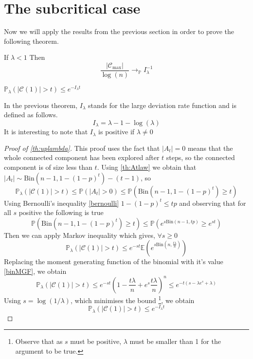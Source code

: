 \section{The subcritical case}
Now we will apply the results from the previous section in order to prove the following theorem.
\begin{theorem}\label{th:subCritCV}
	If $\lambda < 1$
	\newline
	Then
	\begin{equation}
		\frac{|\mathcal{C}_{\max}|}{\log(n)} \longrightarrow_\mathbb{P} I_{\lambda}^{-1}
	\end{equation}
\end{theorem}
\begin{theorem}\label{th:uplambda}
	$\mathbb{P}_{\lambda}(|\mathcal{C}(1)| >t) \leq e^{-I_{\lambda}t}$
\end{theorem}
In the previous theorem, $I_{\lambda}$ stands for the large deviation rate function and is defined as follows.
\begin{equation}
	I_{\lambda} = \lambda - 1 - \log(\lambda)
\end{equation}
It is interesting to note that $I_\lambda$ is positive if $\lambda \neq 0$
\begin{proof}[Proof of \ref{th:uplambda}]
	This proof uses the fact that $|A_t| = 0$ means that the whole connected component has been explored after $t$ steps, so the connected component is of size less than $t$.
	Using \ref{th:Atlaw} we obtain that $|A_t| \sim \text{Bin}(n-1, 1-(1-p)^t) - (t-1)$, so 
	\begin{equation}
		\mathbb{P}_{\lambda}(|\mathcal{C}(1)| > t ) \leq \mathbb{P}(|A_t|>0) \leq \mathbb{P}(\text{Bin}(n-1, 1-(1-p)^t) \geq t)
	\end{equation}
	Using Bernoulli's inequality \ref{bernoulli} $ 1- (1-p)^t \leq tp$ and observing that for all $s$ positive the following is true
	\begin{equation}
		\mathbb{P}(\text{Bin}(n-1, 1-(1-p)^t) \geq t) \leq \mathbb{P}(e^{s\text{Bin}(n-1, tp)} \geq e^{st}) 
	\end{equation}
	Then we can apply Markov inequality which gives, $\forall s \geq 0$ 
	\begin{equation}
		\mathbb{P}_{\lambda}(|\mathcal{C}(1)| > t ) \leq e^{-st}\mathbb{E}(e^{s\text{Bin}(n, \frac{t\lambda}{n})})
	\end{equation}
	Replacing the moment generating function of the binomial with it's value \ref{binMGF}, we obtain 
	\begin{equation}
		\mathbb{P}_{\lambda}(|\mathcal{C}(1)| > t ) \leq e^{-st}(1 - \frac{t\lambda}{n} + e^s\frac{t\lambda}{n})^n \leq e^{-t(s - \lambda e^s + \lambda)}
	\end{equation}
	Using $s=\log(1/\lambda)$, which minimises the bound \footnote{ Observe that as $s$ must be positive, $\lambda$ must be smaller than 1 for the argument to be true.}, we obtain
	\begin{equation}
		\mathbb{P}_{\lambda}(|\mathcal{C}(1)| >t) \leq e^{-I_{\lambda}t}
	\end{equation}
\end{proof}
